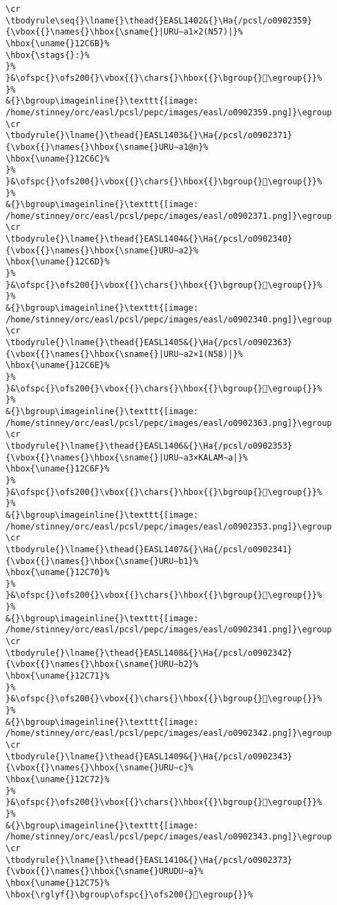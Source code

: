 \begin{verbatim}
\cr
\tbodyrule\seq{}\lname{}\thead{}EASL1402&{}\Ha{/pcsl/o0902359}{\vbox{{}\names{}\hbox{\sname{}|URU∼a1×2(N57)|}%
\hbox{\uname{}12C6B}%
\hbox{\stags{}:}%
}%
}&\ofspc{}\ofs200{}\vbox{{}\chars{}\hbox{{}\bgroup{}𒱫\egroup{}}%
}%
&{}\bgroup\imageinline{}\texttt{[image: /home/stinney/orc/easl/pcsl/pepc/images/easl/o0902359.png]}\egroup
\cr
\tbodyrule{}\lname{}\thead{}EASL1403&{}\Ha{/pcsl/o0902371}{\vbox{{}\names{}\hbox{\sname{}URU∼a1@n}%
\hbox{\uname{}12C6C}%
}%
}&\ofspc{}\ofs200{}\vbox{{}\chars{}\hbox{{}\bgroup{}𒱬\egroup{}}%
}%
&{}\bgroup\imageinline{}\texttt{[image: /home/stinney/orc/easl/pcsl/pepc/images/easl/o0902371.png]}\egroup
\cr
\tbodyrule{}\lname{}\thead{}EASL1404&{}\Ha{/pcsl/o0902340}{\vbox{{}\names{}\hbox{\sname{}URU∼a2}%
\hbox{\uname{}12C6D}%
}%
}&\ofspc{}\ofs200{}\vbox{{}\chars{}\hbox{{}\bgroup{}𒱭\egroup{}}%
}%
&{}\bgroup\imageinline{}\texttt{[image: /home/stinney/orc/easl/pcsl/pepc/images/easl/o0902340.png]}\egroup
\cr
\tbodyrule{}\lname{}\thead{}EASL1405&{}\Ha{/pcsl/o0902363}{\vbox{{}\names{}\hbox{\sname{}|URU∼a2×1(N58)|}%
\hbox{\uname{}12C6E}%
}%
}&\ofspc{}\ofs200{}\vbox{{}\chars{}\hbox{{}\bgroup{}𒱮\egroup{}}%
}%
&{}\bgroup\imageinline{}\texttt{[image: /home/stinney/orc/easl/pcsl/pepc/images/easl/o0902363.png]}\egroup
\cr
\tbodyrule{}\lname{}\thead{}EASL1406&{}\Ha{/pcsl/o0902353}{\vbox{{}\names{}\hbox{\sname{}|URU∼a3×KALAM∼a|}%
\hbox{\uname{}12C6F}%
}%
}&\ofspc{}\ofs200{}\vbox{{}\chars{}\hbox{{}\bgroup{}𒱯\egroup{}}%
}%
&{}\bgroup\imageinline{}\texttt{[image: /home/stinney/orc/easl/pcsl/pepc/images/easl/o0902353.png]}\egroup
\cr
\tbodyrule{}\lname{}\thead{}EASL1407&{}\Ha{/pcsl/o0902341}{\vbox{{}\names{}\hbox{\sname{}URU∼b1}%
\hbox{\uname{}12C70}%
}%
}&\ofspc{}\ofs200{}\vbox{{}\chars{}\hbox{{}\bgroup{}𒱰\egroup{}}%
}%
&{}\bgroup\imageinline{}\texttt{[image: /home/stinney/orc/easl/pcsl/pepc/images/easl/o0902341.png]}\egroup
\cr
\tbodyrule{}\lname{}\thead{}EASL1408&{}\Ha{/pcsl/o0902342}{\vbox{{}\names{}\hbox{\sname{}URU∼b2}%
\hbox{\uname{}12C71}%
}%
}&\ofspc{}\ofs200{}\vbox{{}\chars{}\hbox{{}\bgroup{}𒱱\egroup{}}%
}%
&{}\bgroup\imageinline{}\texttt{[image: /home/stinney/orc/easl/pcsl/pepc/images/easl/o0902342.png]}\egroup
\cr
\tbodyrule{}\lname{}\thead{}EASL1409&{}\Ha{/pcsl/o0902343}{\vbox{{}\names{}\hbox{\sname{}URU∼c}%
\hbox{\uname{}12C72}%
}%
}&\ofspc{}\ofs200{}\vbox{{}\chars{}\hbox{{}\bgroup{}𒱲\egroup{}}%
}%
&{}\bgroup\imageinline{}\texttt{[image: /home/stinney/orc/easl/pcsl/pepc/images/easl/o0902343.png]}\egroup
\cr
\tbodyrule{}\lname{}\thead{}EASL1410&{}\Ha{/pcsl/o0902373}{\vbox{{}\names{}\hbox{\sname{}URUDU∼a}%
\hbox{\uname{}12C75}%
\hbox{\rglyf{}\bgroup\ofspc{}\ofs200{}𒱵\egroup{}}%

\end{verbatim}
